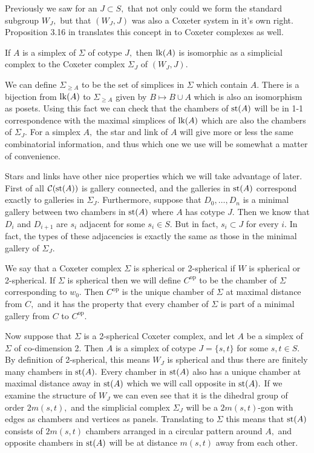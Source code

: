 \documentclass[class=book, crop=false,12 pt]{standalone}
\newcommand{\cop}{\ensuremath{C^{\text{op}}}}
\begin{document}
Previously we saw for an $J\subset S,$ that not only could we form the standard subgroup $W_J,$ but that $(W_J,J)$ was also a Coxeter system in it's own right. Proposition 3.16 in \cite{buildings} translates this concept in to Coxeter complexes as well.
\begin{prop}
	\label{prop:link}
	If $A$ is a simplex of $\Sigma$ of cotype $J,$ then $\mathrm{lk}(A)$ is isomorphic as a simplicial complex to the Coxeter complex $\Sigma_J$ of $(W_J,J).$
\end{prop}

We can define $\Sigma_{\ge A}$ to be the set of simplices in $\Sigma$ which contain $A.$ There is a bijection from $\mathrm{lk}(A)$ to $\Sigma_{\ge A}$ given by $B\mapsto B\cup A$ which is also an isomorphism as posets. Using this fact we can check that the chambers of $\mathrm{st}(A)$ will be in 1-1 correspondence with the maximal simplices of $\mathrm{lk}(A)$ which are also the chambers of $\Sigma_J.$ For a simplex $A,$ the star and link of $A$ will give more or less the same combinatorial information, and thus which one we use will be somewhat a matter of convenience.

Stars and links have other nice properties which we will take advantage of later. First of all $\mathcal{C}(\mathrm{st}(A))$ is gallery connected, and the galleries in $\mathrm{st}(A)$ correspond exactly to galleries in $\Sigma_J.$ Furthermore, suppose that $D_0,\dots,D_n$ is a minimal gallery between two chambers in $\mathrm{st}(A)$ where $A$ has cotype $J.$ Then we know that $D_i$ and $D_{i+1}$ are $s_i$ adjacent for some $s_i\in S.$ But in fact, $s_i\subset J$ for every $i.$ In fact, the types of these adjacencies is exactly the same as those in the minimal gallery of $\Sigma_J.$ 

We say that a Coxeter complex $\Sigma$ is spherical or 2-spherical if $W$ is spherical or 2-spherical. If $\Sigma$ is spherical then we will define $C^{\text{op}}$ to be the chamber of $\Sigma$ corresponding to $w_0.$ Then $\cop$ is the unique chamber of $\Sigma$ at maximal distance from $C,$ and it has the property that every chamber of $\Sigma$ is part of a minimal gallery from $C$ to $\cop.$ 

Now suppose that $\Sigma$ is a 2-spherical Coxeter complex, and let $A$ be a simplex of $\Sigma$ of co-dimension 2. Then $A$ is a simplex of cotype $J=\{s,t\}$ for some $s,t\in S.$ By definition of 2-spherical, this means $W_J$ is spherical and thus there are finitely many chambers in $\mathrm{st}(A).$ Every chamber in $\mathrm{st}(A)$ also has a unique chamber at maximal distance away in $\mathrm{st}(A)$ which we will call opposite in $\mathrm{st}(A).$ If we examine the structure of $W_J$ we can even see that it is the dihedral group of order $2m(s,t),$ and the simplicial complex $\Sigma_J$ will be a $2m(s,t)$-gon with edges as chambers and vertices as panels. Translating to $\Sigma$ this means that $\mathrm{st}(A)$ consists of $2m(s,t)$ chambers arranged in a circular pattern around $A,$ and opposite chambers in $\mathrm{st}(A)$ will be at distance $m(s,t)$ away from each other. 
\end{document}
